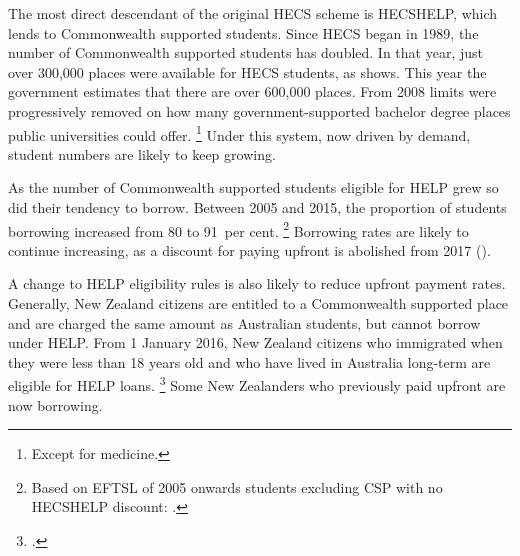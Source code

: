 \documentclass[embargoed]{grattan}
\begin{document}
The most direct descendant of the original \gls{HECS} scheme is \gls{HECSHELP}, which lends to \gls{Commonwealth supported} students.
Since \gls{HECS} began in 1989, the number of \gls{Commonwealth supported} students has doubled.
In that year, just over 300,000 places were available for \gls{HECS} students, as  shows.\afterpage{\cleardoublepage} %
This year the government estimates that there are over 600,000 places.
From 2008 limits were progressively removed on how many government-supported bachelor degree places public universities could offer.%
\footnote{Except for medicine.} 
Under this system, now driven by demand, student numbers are likely to keep growing.


As the number of \gls{Commonwealth supported} students eligible for \gls{HELP} grew so did their tendency to borrow.
Between 2005 and 2015, the proportion of students borrowing increased from 80 to 91~per cent.%
\footnote{Based on \gls{EFTSL} of 2005 onwards students excluding CSP with no \gls{HECSHELP} discount: \textcite[][section 5: liability status categories]{EducationvariousyearsSelectedhighereducation}.} Borrowing rates are likely to continue increasing, as a discount for paying upfront is abolished from 2017 ().

A change to \gls{HELP} eligibility rules is also likely to reduce upfront payment rates.
Generally, New Zealand citizens are entitled to a \gls{Commonwealth supported} place and are charged the same amount as Australian students, but cannot borrow under \gls{HELP}\@.
From 1 January 2016, New Zealand citizens who immigrated when they were less than 18 years old and who have lived in Australia long-term are eligible for \gls{HELP} loans.%
\footcite{Education2016FAQsNewZealand} Some New Zealanders who previously paid upfront are now borrowing.
\end{document}
